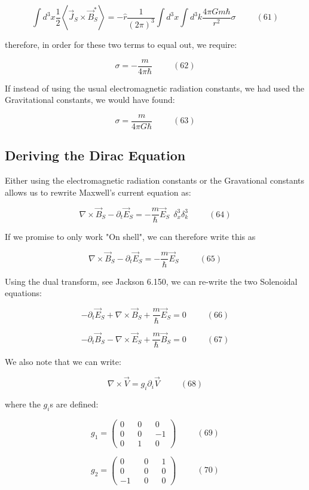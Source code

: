 \documentclass {article}
\begin{document}
$$\int d^3x \frac 1 2 \left< \vec J_S \times \vec B_S^* \right> = -\hat{r} \frac 1 {(2 \pi)^3} \int d^3x \int d^3k \frac {4\pi G m\hbar}{r^2} \sigma ~~~~~~~~~~~ (61)$$

therefore, in order for these two terms to equal out, we require:

$$\sigma = - \frac m {4 \pi \hbar} ~~~~~~~~~~~ (62)$$

If instead of using the usual electromagnetic radiation constants, we had used the Gravitational constants, we would have found:

$$\sigma =  \frac m {4\pi G \hbar} ~~~~~~~~~~~ (63)$$

\subsection{Deriving the Dirac Equation}

Either using the electromagnetic radiation constants or the Gravational constants allows us to rewrite Maxwell's  current equation as:

$$\nabla \times \vec B_S  - \partial_t \vec E_S  = - \frac m {\hbar} \vec E_S ~~ \delta^3_x \delta^3_k ~~~~~~~~~~~ (64)$$

If we promise to only work "On shell", we can therefore write this as

$$\nabla \times \vec B_S  - \partial_t \vec E_S  = - \frac m {\hbar} \vec E_S ~~~~~~~~~~~ (65)$$

Using the dual transform, see Jackson 6.150, we can re-write the two Solenoidal equations:

$$-\partial_t \vec E_S + \nabla \times \vec B_S   +\frac m {\hbar} \vec E_S = 0 ~~~~~~~~~~~ (66)$$ 

$$ -\partial_t \vec B_S - \nabla \times \vec E_S   +\frac m {\hbar} \vec B_S = 0 ~~~~~~~~~~~ (67)$$ 

We also note that we can write:

$$\nabla \times \vec V = g_i \partial_i \vec V ~~~~~~~~~~~ (68)$$

where the $g_i$s are defined:

$$g_1 = \left(\begin{matrix}  0 && 0 && 0 \\ 0 && 0 && -1 \\ 0 && 1 && 0 \end{matrix}\right) ~~~~~~~~~~~ (69)$$

$$g_2 = \left(\begin{matrix}  0 && 0 && 1 \\ 0 && 0 && 0 \\ -1 && 0 && 0 \end{matrix}\right) ~~~~~~~~~~~ (70)$$
\end{document}
